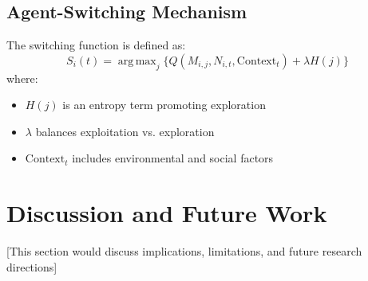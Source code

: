 \documentclass[12pt, a4paper]{article}
\DeclareMathOperator*{\argmax}{arg\,max}
\begin{document}
\subsection{Agent-Switching Mechanism}
The switching function is defined as:
\begin{equation}
    S_i(t) = \argmax_{j} \{Q(M_{i,j}, N_{i,t}, \text{Context}_t) + \lambda H(j)\}
\end{equation}
where:
\begin{itemize}
    \item $H(j)$ is an entropy term promoting exploration
    \item $\lambda$ balances exploitation vs. exploration
    \item $\text{Context}_t$ includes environmental and social factors
\end{itemize}

\section{Discussion and Future Work}
[This section would discuss implications, limitations, and future research directions]
\end{document}
